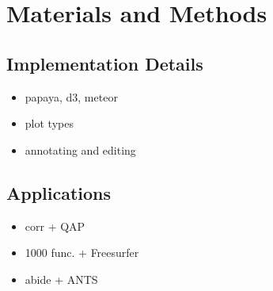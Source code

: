 \section{Materials and Methods}

\subsection{Implementation Details}

\begin{itemize}
\item papaya, d3, meteor
\item plot types
\item annotating and editing
\end{itemize}

\subsection{Applications}

\begin{itemize}
\item corr + QAP
\item 1000 func. + Freesurfer
\item abide + ANTS
\end{itemize}


